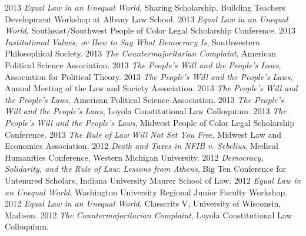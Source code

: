 \documentclass[letterpaper]{moderncv}
\begin{document}
\vspace{1mm}
\cvitem
{2013}
{\textit{Equal Law in an Unequal World}, Sharing Scholarship, Building Teachers Development Workshop at Albany Law School.}
\vspace{1mm}
\cvitem
{2013}
{\textit{Equal Law in an Unequal World}, Southeast/Southwest People of Color Legal Scholarship Conference.}
\vspace{1mm}
\cvitem
{2013}
{\textit{Institutional Values, or How to Say What Democracy Is}, Southwestern Philosophical Society.}
\vspace{1mm}
\cvitem
{2013}
{\textit{The Countermajoritarian Complaint}, American Political Science Association.}
\vspace{1mm}
\cvitem
{2013}
{\textit{The People's Will and the People's Laws}, Association for Political Theory.}
\vspace{1mm}
\cvitem
{2013}
{\textit{The People's Will and the People's Laws}, Annual Meeting of the Law and Society Association.}
\vspace{1mm}
\cvitem
{2013}
{\textit{The People's Will and the People's Laws}, American Political Science Association.}
\vspace{1mm}
\cvitem
{2013}
{\textit{The People's Will and the People's Laws}, Loyola Constitutional Law Colloquium.}
\vspace{1mm}
\cvitem
{2013}
{\textit{The People's Will and the People's Laws}, Midwest People of Color Legal Scholarship Conference.}
\vspace{1mm}
\cvitem
{2013}
{\textit{The Rule of Law Will Not Set You Free}, Midwest Law and Economics Association.}
\vspace{1mm}
\cvitem
{2012}
{\textit{Death and Taxes in NFIB v. Sebelius}, Medical Humanities Conference, Western Michigan University.}
\vspace{1mm}
\cvitem
{2012}
{\textit{Democracy, Solidarity, and the Rule of Law: Lessons from Athens}, Big Ten Conference for Untenured Scholars, Indiana University Maurer School of Law.}
\vspace{1mm}
\cvitem
{2012}
{\textit{Equal Law in an Unequal World}, Washington University Regional Junior Faculty Workshop.}
\vspace{1mm}
\cvitem
{2012}
{\textit{Equal Law in an Unequal World}, Classcrits V, University of Wisconsin, Madison.}
\vspace{1mm}
\cvitem
{2012}
{\textit{The Countermajoritarian Complaint}, Loyola Constitutional Law Colloquium.}
\vspace{1mm}
\cvitem
\end{document}
